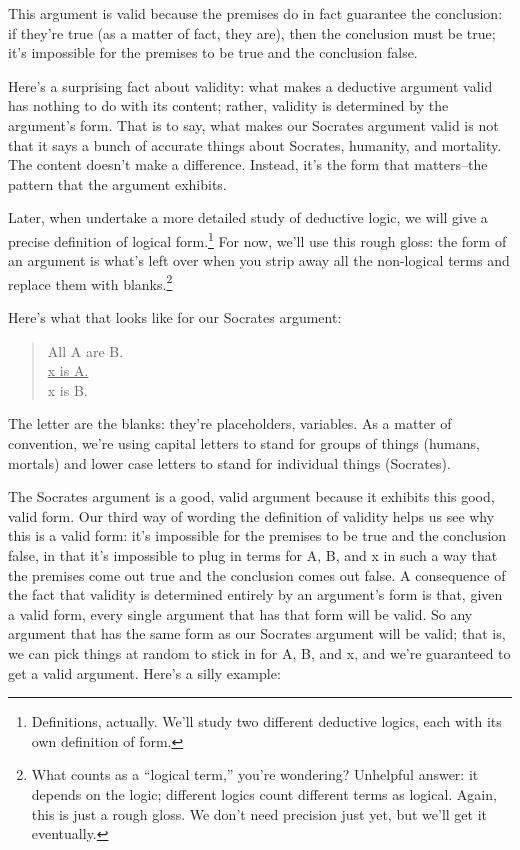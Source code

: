 This argument is valid because the premises do in fact guarantee the conclusion: if they're true (as
a matter of fact, they are), then the conclusion must be true; it's impossible for the premises to be
true and the conclusion false.

Here's a surprising fact about validity: what makes a deductive argument valid has nothing to do
with its content; rather, validity is determined by the argument's form. That is to say, what makes
our Socrates argument valid is not that it says a bunch of accurate things about Socrates, humanity,
and mortality. The content doesn't make a difference. Instead, it's the form that matters--the
pattern that the argument exhibits.

Later, when undertake a more detailed study of deductive logic, we will give a precise definition
of logical form.\footnote{Definitions, actually. We'll study two different deductive logics, each with its own definition of form.}
For now, we'll use this rough gloss: the form of an argument is what's left over
when you strip away all the non-logical terms and replace them with 
blanks.\footnote{What counts as a ``logical term,'' you're wondering? Unhelpful answer: it depends on the logic; different logics count
different terms as logical. Again, this is just a rough gloss. We don't need precision just yet, but we'll get it eventually.}

Here's what that looks like for our Socrates argument:

\begin{quote}
All A are B. \\
\underline{x is A.} \\
x is B. \\
\end{quote}

The letter are the blanks: they're placeholders, variables. As a matter of convention, we're using
capital letters to stand for groups of things (humans, mortals) and lower case letters to stand for
individual things (Socrates).

The Socrates argument is a good, valid argument because it exhibits this good, valid form. Our
third way of wording the definition of validity helps us see why this is a valid form: it's impossible
for the premises to be true and the conclusion false, in that it's impossible to plug in terms for A,
B, and x in such a way that the premises come out true and the conclusion comes out false.
A consequence of the fact that validity is determined entirely by an argument's form is that, given
a valid form, every single argument that has that form will be valid. So any argument that has the
same form as our Socrates argument will be valid; that is, we can pick things at random to stick in
for A, B, and x, and we're guaranteed to get a valid argument. Here's a silly example:

